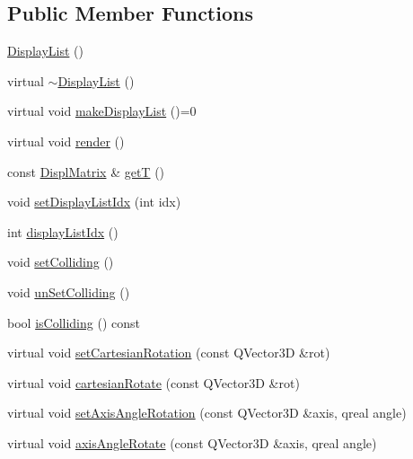 \subsection*{Public Member Functions}
\begin{DoxyCompactItemize}
\item 
\hyperlink{class_robot_model_1_1_display_list_a71d74802d0190f52c0c4ad7c6d5351f9}{DisplayList} ()
\item 
virtual \hyperlink{class_robot_model_1_1_display_list_a4c2105212d624723af920c798c1712cf}{$\sim$DisplayList} ()
\item 
virtual void \hyperlink{class_robot_model_1_1_display_list_a842de97924298c7363e50aebd69e5a50}{makeDisplayList} ()=0
\item 
virtual void \hyperlink{class_robot_model_1_1_display_list_a5f95e85c192a2bc8f06f18075e6fefd7}{render} ()
\item 
const \hyperlink{class_robot_model_1_1_displ_matrix}{DisplMatrix} \& \hyperlink{class_robot_model_1_1_display_list_a2e08e72148fc8bb77a693b769a16711a}{getT} ()
\item 
void \hyperlink{class_robot_model_1_1_display_list_a78c642f12487ea830475a0e860aeee38}{setDisplayListIdx} (int idx)
\item 
int \hyperlink{class_robot_model_1_1_display_list_a2c405729d9a5d904b9c292fd87c3be05}{displayListIdx} ()
\item 
void \hyperlink{class_robot_model_1_1_display_list_aab3355867d2a992c208f2173fc29e221}{setColliding} ()
\item 
void \hyperlink{class_robot_model_1_1_display_list_a7440037838409ae852e02183245b338d}{unSetColliding} ()
\item 
bool \hyperlink{class_robot_model_1_1_display_list_a32f1a046e32b479110977c5efec41cc3}{isColliding} () const 
\item 
virtual void \hyperlink{class_robot_model_1_1_display_list_a7d52ea010f54755bcb3bfae9e26dd0c2}{setCartesianRotation} (const QVector3D \&rot)
\item 
virtual void \hyperlink{class_robot_model_1_1_display_list_a023ba88eaac38b26dc9ea6a358467637}{cartesianRotate} (const QVector3D \&rot)
\item 
virtual void \hyperlink{class_robot_model_1_1_display_list_a56a652740c494995c0ff55d1a5fd896d}{setAxisAngleRotation} (const QVector3D \&axis, qreal angle)
\item 
virtual void \hyperlink{class_robot_model_1_1_display_list_a9a7084168997ac285ee1e9f4041a8d57}{axisAngleRotate} (const QVector3D \&axis, qreal angle)

\end{DoxyCompactItemize}
